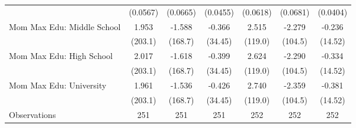 {\begin{tabular}{l*{6}{c}}
                    &    (0.0567)         &    (0.0665)         &    (0.0455)         &    (0.0618)         &    (0.0681)         &    (0.0404)         \\
\addlinespace
Mom Max Edu: Middle School&       1.953         &      -1.588         &      -0.366         &       2.515         &      -2.279         &      -0.236         \\
                    &     (203.1)         &     (168.7)         &     (34.45)         &     (119.0)         &     (104.5)         &     (14.52)         \\
\addlinespace
Mom Max Edu: High School&       2.017         &      -1.618         &      -0.399         &       2.624         &      -2.290         &      -0.334         \\
                    &     (203.1)         &     (168.7)         &     (34.45)         &     (119.0)         &     (104.5)         &     (14.52)         \\
\addlinespace
Mom Max Edu: University&       1.961         &      -1.536         &      -0.426         &       2.740         &      -2.359         &      -0.381         \\
                    &     (203.1)         &     (168.7)         &     (34.45)         &     (119.0)         &     (104.5)         &     (14.52)         \\
\midrule
Observations        &         251         &         251         &         251         &         252         &         252         &         252         \\
\bottomrule
\end{tabular}
}
